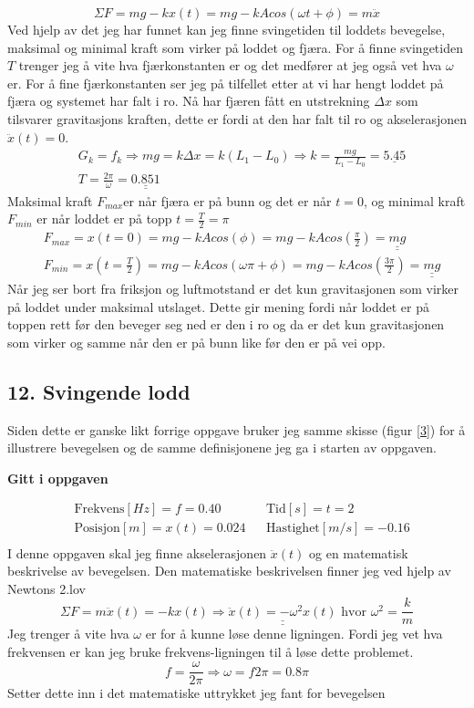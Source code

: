 \documentclass[a4paper,12pt,norsk]{article}
\newcommand{\uu}{\underline}
\begin{document}
$$
\Sigma F = mg -kx(t) = mg - kAcos(\omega t + \phi) = m\ddot{x}
$$
Ved hjelp av det jeg har funnet kan jeg finne svingetiden til loddets bevegelse, maksimal og minimal kraft som virker på loddet og fjæra. For å finne svingetiden $T$ trenger jeg å vite hva fjærkonstanten er og det medfører at jeg også vet hva $\omega$ er.
For å fine fjærkonstanten ser jeg på tilfellet etter at vi har hengt loddet på fjæra og systemet har falt i ro. Nå har fjæren fått en utstrekning $\Delta x$ som tilsvarer gravitasjons kraften, dette er fordi at den har falt til ro og akselerasjonen $\ddot{x}(t)=0$.
\begin{align*}
&G_k = f_k \Rightarrow mg = k\Delta x = k(L_1-L_0) \Rightarrow k=\frac{mg}{L_1-L_0} = \underline{5.45}\\
&T = \frac{2 \pi}{\omega} = \underline{\underline{0.851}}
\end{align*}
Maksimal kraft $F_{max}$er når fjæra er på bunn og det er når $t=0$, og minimal kraft $F_{min}$ er når loddet er på topp $t = \frac{T}{2} = \pi$
\begin{align*}
&F_{max} = x(t=0) = mg - kAcos(\phi) = mg - kAcos(\frac{\pi}{2}) = \underline{\underline{mg}}\\
&F_{min} = x(t=\frac{T}{2}) = mg -kAcos(\omega \pi + \phi) = mg - kAcos\left(\frac{3\pi}{2}\right) =  \underline{\underline{mg}}
\end{align*}
Når jeg ser bort fra friksjon og luftmotstand er det kun gravitasjonen som virker på loddet under maksimal utslaget. Dette gir mening fordi når loddet er på toppen rett før den beveger seg ned er den i ro og da er det kun gravitasjonen som virker og samme når den er på bunn like før den er på vei opp. 

\subsection{12. Svingende lodd}

Siden dette er ganske likt forrige oppgave bruker jeg samme skisse (figur \vref{3}) for å illustrere bevegelsen og de samme definisjonene jeg ga i starten av oppgaven.
\begin{center}
\textbf{Gitt i oppgaven}
\end{center}
\begin{align*}
&\text{Frekvens}[Hz] = f =  0.40 && \text{Tid}[s] = t = 2  \\
&\text{Posisjon}[m]= x(t) = 0.024  && \text{Hastighet}[m/s] = -0.16 \\
\end{align*}
I denne oppgaven skal jeg finne akselerasjonen $\ddot{x}(t)$ og en matematisk beskrivelse av bevegelsen. 
Den matematiske beskrivelsen finner jeg ved hjelp av Newtons 2.lov
$$
\Sigma F = m\ddot{x}(t) = -kx(t) \Rightarrow \uu{\uu{\ddot{x}(t) =- \omega ^2x(t)}} \text{ hvor } \omega ^2 = \frac{k}{m} 
$$
Jeg trenger å vite hva $\omega$ er for å kunne løse denne ligningen. Fordi jeg vet hva frekvensen er kan jeg bruke frekvens-ligningen til å løse dette problemet.
$$
f = \frac{\omega}{2\pi} \Rightarrow \omega = f2\pi = 0.8\pi
$$
Setter dette inn i det matematiske uttrykket jeg fant for bevegelsen
\end{document}

